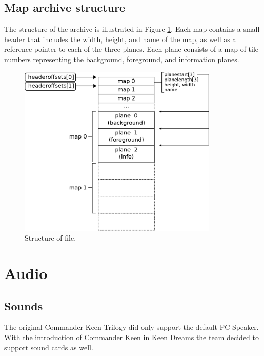 \documentclass[book.tex]{subfiles}
\begin{document}
\pagebreak
 
\subsection{Map archive structure}
The structure of the  archive is illustrated in Figure \ref{fig:map-file}. Each map contains a small header that includes the width, height, and name of the map, as well as a reference pointer to each of the three planes. Each plane consists of a map of tile numbers representing the background, foreground, and information planes.\\

\par
\begin{minipage}{\textwidth}
 \par
 \end{minipage}
 
\par
\begin{figure}[H]
\centering
 \includegraphics[width=0.85\textwidth]{imgs/drawings/kdreams_map.eps}
 \caption{Structure of  file.}
 \label{fig:map-file}
\end{figure}

\section{Audio}
\subsection{Sounds}
The original Commander Keen Trilogy did only support the default PC Speaker. With the introduction of Commander Keen in Keen Dreams the team decided to support sound cards as well.\\
\end{document}

